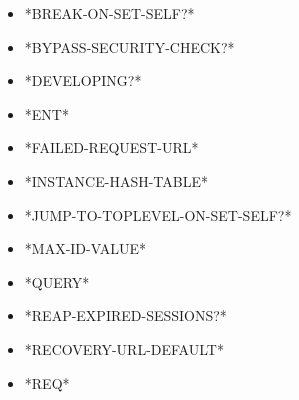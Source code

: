 \documentclass [11pt]{book}
\begin{document}
\begin{itemize}

\item {}*BREAK-ON-SET-SELF?*





\item {}*BYPASS-SECURITY-CHECK?*





\item {}*DEVELOPING?*





\item {}*ENT*





\item {}*FAILED-REQUEST-URL*





\item {}*INSTANCE-HASH-TABLE*





\item {}*JUMP-TO-TOPLEVEL-ON-SET-SELF?*





\item {}*MAX-ID-VALUE*





\item {}*QUERY*





\item {}*REAP-EXPIRED-SESSIONS?*





\item {}*RECOVERY-URL-DEFAULT*





\item {}*REQ*





\end{itemize}
\end{document}
